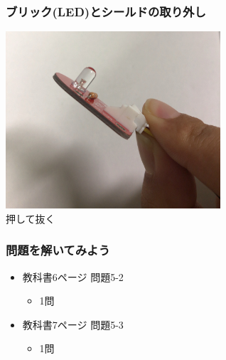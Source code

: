 \begin{frame}
    \frametitle{ブリック(LED)とシールドの取り外し}
    \begin{center}
        \includegraphics[width=0.6\textwidth]{images/chap05/text05-img011.jpg}
        {\\押して抜く}
    \end{center}
\end{frame}

\begin{frame}[fragile]
    \frametitle{問題を解いてみよう}
    \begin{itemize}
        \item 教科書6ページ 問題5-2
        \begin{itemize}
            \item 1問
        \end{itemize}
        \item 教科書7ページ 問題5-3
        \begin{itemize}
            \item 1問
        \end{itemize}
    \end{itemize}
\end{frame}
